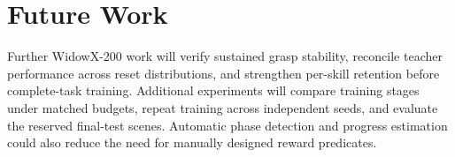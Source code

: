 \section{Future Work}\label{sec:future}
Further WidowX-200 work will verify sustained grasp stability, reconcile teacher performance across reset distributions, and strengthen per-skill retention before complete-task training. Additional experiments will compare training stages under matched budgets, repeat training across independent seeds, and evaluate the reserved final-test scenes. Automatic phase detection and progress estimation could also reduce the need for manually designed reward predicates.
